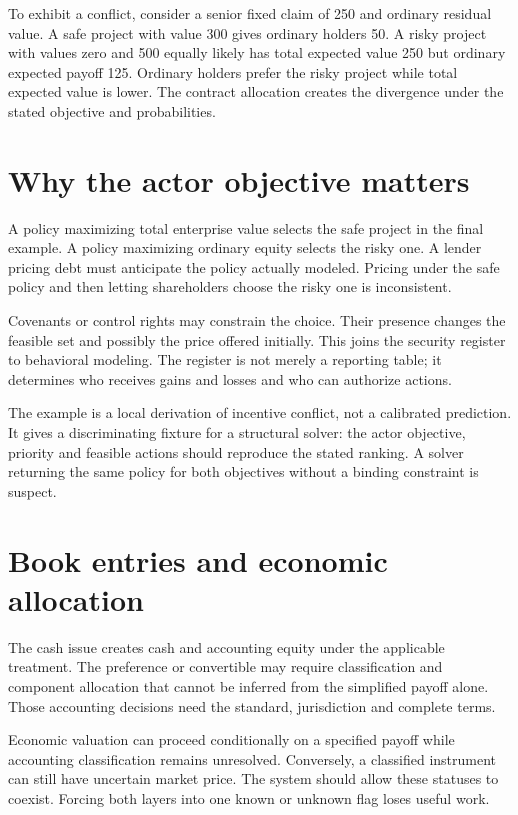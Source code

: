 To exhibit a conflict, consider a senior fixed claim of 250 and ordinary residual value. A safe project with value 300 gives ordinary holders 50. A risky project with values zero and 500 equally likely has total expected value 250 but ordinary expected payoff 125. Ordinary holders prefer the risky project while total expected value is lower. The contract allocation creates the divergence under the stated objective and probabilities.

\section{Why the actor objective matters}
A policy maximizing total enterprise value selects the safe project in the final example. A policy maximizing ordinary equity selects the risky one. A lender pricing debt must anticipate the policy actually modeled. Pricing under the safe policy and then letting shareholders choose the risky one is inconsistent.

Covenants or control rights may constrain the choice. Their presence changes the feasible set and possibly the price offered initially. This joins the security register to behavioral modeling. The register is not merely a reporting table; it determines who receives gains and losses and who can authorize actions.

The example is a local derivation of incentive conflict, not a calibrated prediction. It gives a discriminating fixture for a structural solver: the actor objective, priority and feasible actions should reproduce the stated ranking. A solver returning the same policy for both objectives without a binding constraint is suspect.

\section{Book entries and economic allocation}
The cash issue creates cash and accounting equity under the applicable treatment. The preference or convertible may require classification and component allocation that cannot be inferred from the simplified payoff alone. Those accounting decisions need the standard, jurisdiction and complete terms.

Economic valuation can proceed conditionally on a specified payoff while accounting classification remains unresolved. Conversely, a classified instrument can still have uncertain market price. The system should allow these statuses to coexist. Forcing both layers into one known or unknown flag loses useful work.

